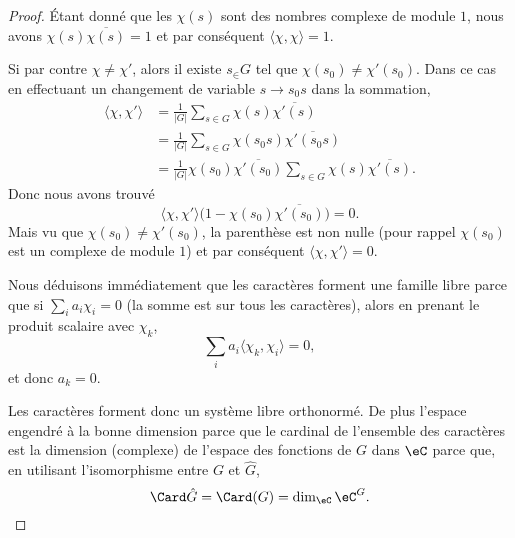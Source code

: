 \begin{proof}
	Étant donné que les \( \chi(s)\) sont des nombres complexe de module \( 1\), nous avons \( \chi(s)\overline{ \chi(s) }=1\) et par conséquent \( \langle \chi, \chi\rangle =1\).

	Si par contre \( \chi\neq\chi'\), alors il existe \( s_\in G\) tel que \( \chi(s_0)\neq \chi'(s_0)\). Dans ce cas en effectuant un changement de variable \( s\to s_0s\) dans la sommation,
	\begin{subequations}
		\begin{align}
			\langle \chi, \chi'\rangle & =\frac{1}{ | G | }\sum_{s\in G}\chi(s)\overline{ \chi'(s) }                                \\
			                           & =\frac{1}{ | G | }\sum_{s\in G}\chi(s_0s)\overline{ \chi'(s_0s) }                          \\
			                           & =\frac{1}{ | G | }\chi(s_0)\overline{\chi'(s_0)}\sum_{s\in G}\chi(s)\overline{ \chi'(s) }.
		\end{align}
	\end{subequations}
	Donc nous avons trouvé
	\begin{equation}
		\langle \chi, \chi'\rangle \big( 1-\chi(s_0)\overline{ \chi'(s_0) } \big)=0.
	\end{equation}
	Mais vu que \( \chi(s_0)\neq \chi'(s_0)\), la parenthèse est non nulle (pour rappel \( \chi(s_0)\) est un complexe de module \( 1\)) et par conséquent \( \langle \chi, \chi'\rangle =0\).

	Nous déduisons immédiatement que les caractères forment une famille libre parce que si \( \sum_ia_i\chi_i=0\) (la somme est sur tous les caractères), alors en prenant le produit scalaire avec \( \chi_k\),
	\begin{equation}
		\sum_ia_i\langle \chi_k, \chi_i\rangle =0,
	\end{equation}
	et donc \( a_k=0\).

	Les caractères forment donc un système libre orthonormé. De plus l'espace engendré à la bonne dimension parce que le cardinal de l'ensemble des caractères est la dimension (complexe) de l'espace des fonctions de \( G\) dans \( \eC\) parce que, en utilisant l'isomorphisme entre \( G\) et \( \hat G\),
	\begin{equation}
		\Card\hat G=\Card(G)=\dim_{\eC}\eC^G.
	\end{equation}
\end{proof}

